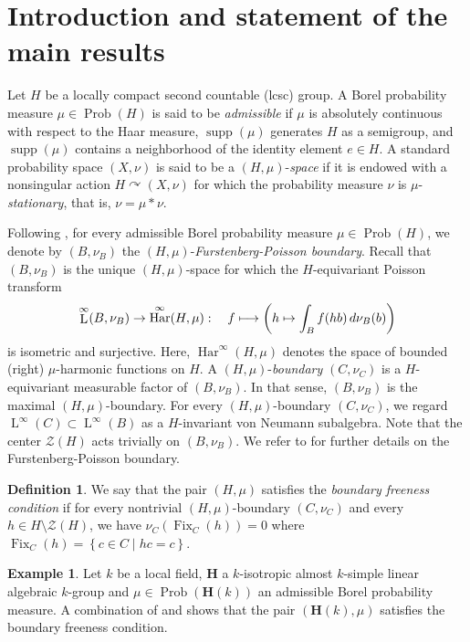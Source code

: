 \documentclass[11pt]{article}
\newcommand\mto{\mathchoice{\longmapsto}{\mapsto}{\mapsto}{\mapsto}}
\newcommand{\bH}{\boldsymbol{H}}
\theoremstyle{definition}
\newtheorem*{example}{Example}
\newtheorem*{definition}{Definition}
\DeclareMathOperator{\Fix}{Fix}
\DeclareMathOperator{\Prob}{Prob}
\DeclareMathOperator{\supp}{supp}
\DeclareMathOperator{\rL}{L}
\DeclareMathOperator{\Har}{Har}
\begin{document}
\section{Introduction and statement of the main results}

Let $H$ be a locally compact second countable (lcsc) group. A Borel probability measure $\mu \in \Prob(H)$ is said to be \emph{admissible} if $\mu$ is absolutely continuous with respect to the Haar measure, $\supp(\mu)$ generates $H$ as a semigroup, and $\supp(\mu)$ contains a neighborhood of the identity element $e \in H$. A standard probability space $(X, \nu)$ is said to be a $(H, \mu)$-\emph{space} if it is endowed with a nonsingular action $H \curvearrowright (X, \nu)$ for which the probability measure $\nu$ is $\mu$-\emph{stationary}, that is, $\nu = \mu \ast \nu$.

Following \cite{Fu62a, Fu62b}, for every admissible Borel probability measure $\mu \in \Prob(H)$, we denote by $(B, \nu_B)$ the $(H, \mu)$-\emph{Furstenberg-Poisson boundary}. Recall that $(B, \nu_B)$ is the unique $(H, \mu)$-space for which the $H$-equivariant Poisson transform
\[
\rL^\infty(B, \nu_B) \to \Har^\infty(H, \mu) :\quad f \mto \left( h \mapsto \int_B f(h b) \, {\rm d}\nu_B(b) \right)
\]
is isometric and surjective. Here, $\Har^\infty(H, \mu)$ denotes the space of bounded (right) $\mu$-harmonic functions on $H$. A $(H, \mu)$-\emph{boundary} $(C, \nu_C)$ is a $H$-equivariant measurable factor of $(B, \nu_B)$. In that sense, $(B, \nu_B)$ is the maximal $(H, \mu)$-boundary. For every $(H, \mu)$-boundary $(C, \nu_C)$, we regard $\rL^\infty(C) \subset \rL^\infty(B)$ as a $H$-invariant von Neumann subalgebra. Note that the center $\mathscr Z(H)$ acts trivially on $(B, \nu_B)$. We refer to \cite{Fu00, BS04} for further details on the Furstenberg-Poisson boundary.

\begin{definition}
We say that the pair $(H, \mu)$ satisfies the \emph{boundary freeness condition} if for every nontrivial $(H, \mu)$-boundary $(C, \nu_C)$ and every $h \in H \setminus \mathscr Z(H)$, we have $\nu_C(\Fix_C(h)) = 0$ where $\Fix_C(h) = \left\{c \in C \mid hc = c \right\}$.
\end{definition}

\begin{example}
Let $k$ be a local field, $\bH$ a $k$-isotropic almost $k$-simple linear algebraic $k$-group and $\mu \in \Prob(\bH(k))$ an admissible Borel probability measure. A combination of \cite[Cor.\,5.2]{BS04} and \cite[Lem.\,6.2]{BBHP20} shows that the pair $(\bH(k), \mu)$ satisfies the boundary freeness condition.
\end{example}
\end{document}
